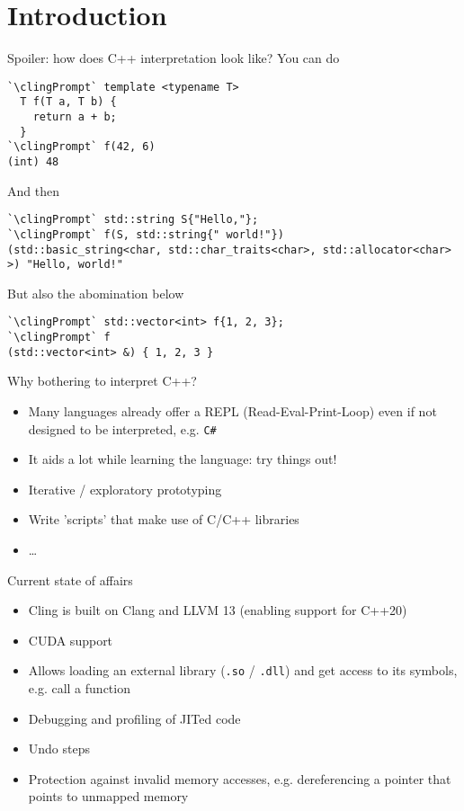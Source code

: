 \section{Introduction}

\begin{frame}[fragile]{Spoiler: how does C++ interpretation look like?}
  You can do
  \begin{lstlisting}[style=c++]
`\clingPrompt` template <typename T>
  T f(T a, T b) {
    return a + b;
  }
`\clingPrompt` f(42, 6)
(int) 48
  \end{lstlisting}

  \pause
  And then
  \begin{lstlisting}[style=c++]
`\clingPrompt` std::string S{"Hello,"};
`\clingPrompt` f(S, std::string{" world!"})
(std::basic_string<char, std::char_traits<char>, std::allocator<char> >) "Hello, world!"
  \end{lstlisting}

  \pause
  But also the abomination below
  \begin{lstlisting}[style=c++]
`\clingPrompt` std::vector<int> f{1, 2, 3};
`\clingPrompt` f
(std::vector<int> &) { 1, 2, 3 }
  \end{lstlisting}
\end{frame}

\begin{frame}{Why bothering to interpret C++?}
  \begin{itemize}
  \item Many languages already offer a REPL (Read-Eval-Print-Loop) even if not designed to be interpreted, e.g. \texttt{C\#}
  \item It aids a lot while learning the language: try things out!
  \item Iterative / exploratory prototyping
  \item Write 'scripts' that make use of C/C++ libraries

  \item \ldots{}
  \end{itemize}
\end{frame}

\begin{frame}{Current state of affairs}
  \begin{itemize}
    \itemsep=1ex

  \item Cling is built on Clang and LLVM 13 (enabling support for C++20)
  \item CUDA support
  \item Allows loading an external library (\texttt{.so} / \texttt{.dll}) and get access to its symbols, e.g. call a function
  \item Debugging and profiling of JITed code
  \item Undo steps
  \item Protection against invalid memory accesses, e.g. dereferencing a pointer that points to unmapped memory
  \end{itemize}
\end{frame}

